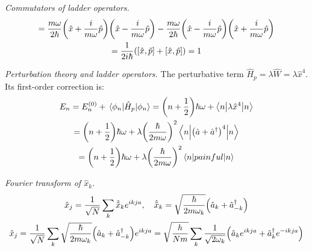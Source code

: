 \documentclass{report}
\begin{document}
\begin{subquests}
	\item \emph{Commutators of ladder operators.}
	\begin{gather*}
		[\hat{a}, \hat{a}^{\dagger}] = \frac{m\omega}{2\hbar}\pqty{\hat{x} + \frac{i}{m\omega}\hat{p}}\pqty{\hat{x} - \frac{i}{m\omega}\hat{p}} - \frac{m\omega}{2\hbar}\pqty{\hat{x} - \frac{i}{m\omega}\hat{p}}\pqty{\hat{x} + \frac{i}{m\omega}\hat{p}} \\ 
		= \frac{1}{2i\hbar}\pqty{[\hat{x},\hat{p}] + [\hat{x},\hat{p}]} = 1
	\end{gather*}

	\item \emph{Perturbation theory and ladder operators.} The perturbative term $\hat H_p = \lambda \hat W = \lambda \hat{x}^4$. Its first-order correction is:
	\begin{gather*}
		E_n = E_n^{(0)} + \mel{\phi_n}{\hat H_p}{\phi_n} = \pqty{n + \frac{1}{2}}\hbar \omega + \mel**{n}{\lambda \hat{x}^4}{n} \\
		= \pqty{n + \frac{1}{2}}\hbar \omega + \lambda\pqty{\frac{\hbar}{2m\omega}}^2\mel**{n}{\pqty{\hat{a} + \hat{a}^{\dagger}}^4}{n} \\
		= \pqty{n + \frac{1}{2}}\hbar \omega + \lambda\pqty{\frac{\hbar}{2m\omega}}^2\mel**{n}{painful}{n}
	\end{gather*}

	\item \emph{Fourier transform of $\hat{x}_k$.} 
	\begin{gather*}
		\hat{x}_j = \frac{1}{\sqrt{N}}\sum_{k}\hat{\tilde{x}}_k e^{ikja}, \quad \hat{\tilde x}_k = \sqrt{\frac{\hbar}{2m\omega_k}}\pqty{\hat{a}_k + \hat{a}_{-k}^{\dagger}} \\
		\hat{x}_j = \frac{1}{\sqrt{N}}\sum_{k} \sqrt{\frac{\hbar}{2m\omega_k}}\pqty{\hat{a}_k + \hat{a}_{-k}^{\dagger}}e^{ikja} = \sqrt{\frac{h}{Nm}}\sum_{k}\frac{1}{\sqrt{2\omega_k}}\pqty{\hat{a}_k e^{ikja}+ \hat{a}_{k}^{\dagger}e^{-ikja}}
	\end{gather*}


\end{subquests}
\end{document}
